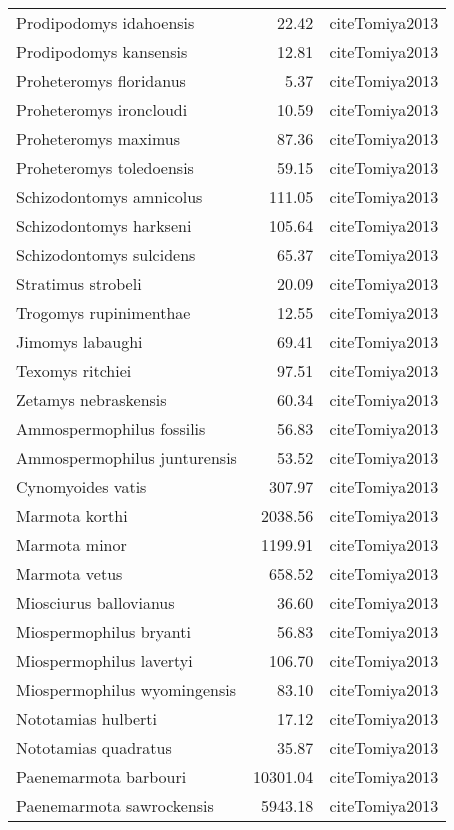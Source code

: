 \begin{table}[ht]
\begin{tabular}{lrl}
  Prodipodomys idahoensis & 22.42 & cite{Tomiya2013} \\ 
  Prodipodomys kansensis & 12.81 & cite{Tomiya2013} \\ 
  Proheteromys floridanus & 5.37 & cite{Tomiya2013} \\ 
  Proheteromys ironcloudi & 10.59 & cite{Tomiya2013} \\ 
  Proheteromys maximus & 87.36 & cite{Tomiya2013} \\ 
  Proheteromys toledoensis & 59.15 & cite{Tomiya2013} \\ 
  Schizodontomys amnicolus & 111.05 & cite{Tomiya2013} \\ 
  Schizodontomys harkseni & 105.64 & cite{Tomiya2013} \\ 
  Schizodontomys sulcidens & 65.37 & cite{Tomiya2013} \\ 
  Stratimus strobeli & 20.09 & cite{Tomiya2013} \\ 
  Trogomys rupinimenthae & 12.55 & cite{Tomiya2013} \\ 
  Jimomys labaughi & 69.41 & cite{Tomiya2013} \\ 
  Texomys ritchiei & 97.51 & cite{Tomiya2013} \\ 
  Zetamys nebraskensis & 60.34 & cite{Tomiya2013} \\ 
  Ammospermophilus fossilis & 56.83 & cite{Tomiya2013} \\ 
  Ammospermophilus junturensis & 53.52 & cite{Tomiya2013} \\ 
  Cynomyoides vatis & 307.97 & cite{Tomiya2013} \\ 
  Marmota korthi & 2038.56 & cite{Tomiya2013} \\ 
  Marmota minor & 1199.91 & cite{Tomiya2013} \\ 
  Marmota vetus & 658.52 & cite{Tomiya2013} \\ 
  Miosciurus ballovianus & 36.60 & cite{Tomiya2013} \\ 
  Miospermophilus bryanti & 56.83 & cite{Tomiya2013} \\ 
  Miospermophilus lavertyi & 106.70 & cite{Tomiya2013} \\ 
  Miospermophilus wyomingensis & 83.10 & cite{Tomiya2013} \\ 
  Nototamias hulberti & 17.12 & cite{Tomiya2013} \\ 
  Nototamias quadratus & 35.87 & cite{Tomiya2013} \\ 
  Paenemarmota barbouri & 10301.04 & cite{Tomiya2013} \\ 
  Paenemarmota sawrockensis & 5943.18 & cite{Tomiya2013} \\ 

\end{tabular}
\end{table}
